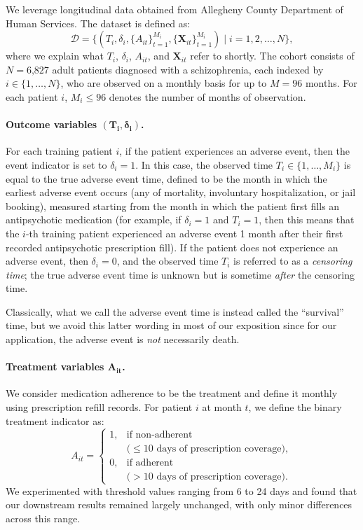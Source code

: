 We leverage longitudinal data obtained from Allegheny County Department of Human Services.
The dataset is defined as:
\[
\mathcal{D} = \{(T_i, \delta_i, \{A_{it}\}_{t=1}^{M_i}, \{\mathbf{X}_{it}\}_{t=1}^{M_i}) \mid i = 1,2,\dots,N\},
\]
where we explain what $T_i$, $\delta_i$, $A_{it}$, and $\mathbf{X}_{it}$ refer to shortly. The cohort consists of \(N = \text{6,827}\) adult patients diagnosed with a schizophrenia, each indexed by \(i \in \{1, \dots, N\}\), who are observed on a monthly basis for up to \(M = 96\) months. 
For each patient \(i\), \(M_i \leq 96\) denotes the number of months of observation.

\paragraph{Outcome variables $\bm{(T_{i},\delta_{i})}$.}
For each training patient \(i\), if the patient experiences an adverse event, then the event indicator is set to $\delta_i = 1$. In this case, the observed time $T_i\in \{1,\dots,M_i\}$ is equal to the true adverse event time, defined to be the month in which the earliest adverse event occurs (any of mortality, involuntary hospitalization, or jail booking), measured starting from the month in which the patient first fills an antipsychotic medication (for example, if $\delta_i=1$ and $T_i=1$, then this means that the $i$-th training patient experienced an adverse event 1 month after their first recorded antipsychotic prescription fill). If the patient does not experience an adverse event, then $\delta_i = 0$, and the observed time $T_i$ is referred to as a \emph{censoring time}; the true adverse event time is unknown but is sometime \emph{after} the censoring time.

Classically, what we call the adverse event time is instead called the ``survival'' time, but we avoid this latter wording in most of our exposition since for our application, the adverse event is \emph{not} necessarily death.

\paragraph{Treatment variables $\bm{A_{it}}$.} 
We consider medication adherence to be the treatment and define it monthly using prescription refill records.
For patient \(i\) at month \(t\), we define the binary treatment indicator as:
\[
A_{it} =
\begin{cases}
1, & \text{if non-adherent} \\
   & \text{(} \leq\text{10 days of prescription coverage)}, \\
0, & \text{if adherent} \\
   & \text{(} >\text{10 days of prescription coverage)}.
\end{cases}
\]
We experimented with threshold values ranging from 6 to 24 days and found that our downstream results remained largely unchanged, with only minor differences across this range.

